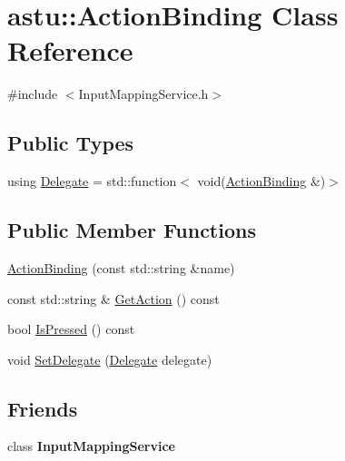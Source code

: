 \hypertarget{classastu_1_1ActionBinding}{}\section{astu\+:\+:Action\+Binding Class Reference}
\label{classastu_1_1ActionBinding}


{\ttfamily \#include $<$Input\+Mapping\+Service.\+h$>$}

\subsection*{Public Types}
\begin{DoxyCompactItemize}
\item 
using \hyperlink{classastu_1_1ActionBinding_ab0e27e5c54f264cb2aa36f65ead9e4ae}{Delegate} = std\+::function$<$ void(\hyperlink{classastu_1_1ActionBinding}{Action\+Binding} \&)$>$
\end{DoxyCompactItemize}
\subsection*{Public Member Functions}
\begin{DoxyCompactItemize}
\item 
\hyperlink{classastu_1_1ActionBinding_a087e1a63f4ae5394a7bfd8a93789eccd}{Action\+Binding} (const std\+::string \&name)
\item 
const std\+::string \& \hyperlink{classastu_1_1ActionBinding_aac38902348ebb25b27677ac2ebd44aed}{Get\+Action} () const
\item 
bool \hyperlink{classastu_1_1ActionBinding_ad0c2ee18d3b6a7719de4463973294467}{Is\+Pressed} () const
\item 
void \hyperlink{classastu_1_1ActionBinding_a56203b1271283b3befebdfc7c67c7836}{Set\+Delegate} (\hyperlink{classastu_1_1ActionBinding_ab0e27e5c54f264cb2aa36f65ead9e4ae}{Delegate} delegate)
\end{DoxyCompactItemize}
\subsection*{Friends}
\begin{DoxyCompactItemize}
\item 
\mbox{\label{classastu_1_1ActionBinding_a8a886d4dcb7950d2c68f97f528f5ab4c}} 
class {\bfseries Input\+Mapping\+Service}
\end{DoxyCompactItemize}



